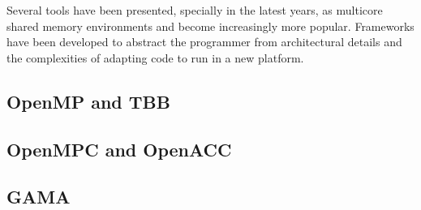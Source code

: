 \documentclass[../thesis]{subfiles}
\begin{document}
		Several tools have been presented, specially in the latest years, as multicore shared memory environments and \hetplats become increasingly more popular. Frameworks have been developed to abstract the programmer from architectural details and the complexities of adapting code to run in a new platform.

		\subsection{OpenMP and TBB}
		\subsection{OpenMPC and OpenACC}
		\subsection{GAMA}
\end{document}
